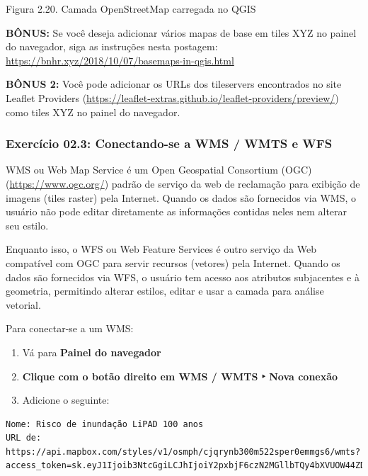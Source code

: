 \documentclass[
]{book}
\providecommand{\tightlist}{%
  \setlength{\itemsep}{0pt}\setlength{\parskip}{0pt}}
\begin{document}
Figura 2.20. Camada OpenStreetMap carregada no QGIS

\textbf{BÔNUS:} Se você deseja adicionar vários mapas de base em tiles XYZ no painel do navegador, siga as instruções nesta postagem: \url{https://bnhr.xyz/2018/10/07/basemaps-in-qgis.html}

\textbf{BÔNUS 2:} Você pode adicionar os URLs dos tileservers encontrados no site Leaflet Providers (\href{https://leaflet-\%20extras.github.io/leaflet-providers/preview/}{https://leaflet-extras.github.io/leaflet-providers/preview/}) como tiles XYZ no painel do navegador.

\hypertarget{exercuxedcio-02.3-conectando-se-a-wms-wmts-e-wfs}{%
\subsubsection{\texorpdfstring{\textbf{Exercício 02.3: Conectando-se a WMS / WMTS e WFS}}{Exercício 02.3: Conectando-se a WMS / WMTS e WFS}}\label{exercuxedcio-02.3-conectando-se-a-wms-wmts-e-wfs}}

WMS ou Web Map Service é um Open Geospatial Consortium (OGC) (\href{https://www\%20.ogc.org\%20/}{https://www.ogc.org/}) padrão de serviço da web de reclamação para exibição de imagens (tiles raster) pela Internet. Quando os dados são fornecidos via WMS, o usuário não pode editar diretamente as informações contidas neles nem alterar seu estilo.

Enquanto isso, o WFS ou Web Feature Services é outro serviço da Web compatível com OGC para servir recursos (vetores) pela Internet. Quando os dados são fornecidos via WFS, o usuário tem acesso aos atributos subjacentes e à geometria, permitindo alterar estilos, editar e usar a camada para análise vetorial.

Para conectar-se a um WMS:

\begin{enumerate}
\def\labelenumi{\arabic{enumi}.}
\tightlist
\item
  Vá para \textbf{Painel do navegador}
\item
  \textbf{Clique com o botão direito em WMS / WMTS ‣ Nova conexão}
\item
  Adicione o seguinte:
\end{enumerate}

\begin{verbatim}
Nome: Risco de inundação LiPAD 100 anos
URL de: https://api.mapbox.com/styles/v1/osmph/cjqrynb300m522sper0emmgs6/wmts?access_token=sk.eyJ1Ijoib3NtcGgiLCJhIjoiY2pxbjF6czN2MGllbTQy4bXVUOW44ZDlMS
\end{verbatim}
\end{document}
